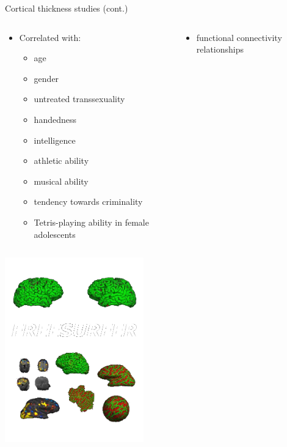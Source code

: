 \documentclass[xcolor=dvipsnames,serif,10pt]{beamer}
\begin{document}
\begin{frame}{Cortical thickness studies (cont.)}
\begin{columns}[c]
  \begin{column}[t]{0.45\textwidth}
    \begin{itemize}
    \item Correlated with:
      \begin{itemize}
		    \item age
		    \item gender
		    \item untreated transsexuality
		    \item handedness
		    \item intelligence
		    \item athletic ability
		    \item musical ability
		    \item tendency towards criminality
		    \item Tetris-playing ability in female adolescents
		  \end{itemize}    
    \end{itemize}
  \end{column}  
  \begin{column}[t]{0.45\textwidth}
    \begin{itemize}
     \item functional connectivity relationships
    \end{itemize}
  \end{column}  
\end{columns}
\end{frame}




\begin{frame}{}

  \begin{center}
    \includegraphics[height=8cm]{Freesurfer.png}
   \end{center}

\end{frame}
\end{document}
